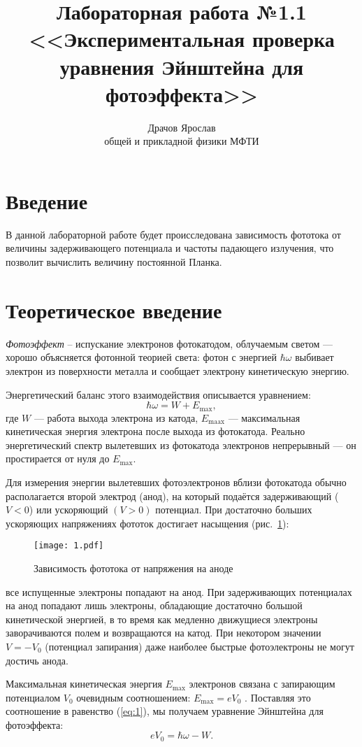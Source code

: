 \documentclass[a4paper]{article}
\title{Лабораторная работа №1.1\\  <<Экспериментальная проверка уравнения Эйнштейна для фотоэффекта>>}
\author{Драчов Ярослав \\ \Факультет общей и прикладной физики МФТИ}
\begin{document}
\maketitle
\section{Введение}
В данной лабораторной работе будет происследована зависимость
фототока от величины задерживающего потенциала и частоты
падающего излучения, что позволит вычислить величину постоянной
Планка.
\section{Теоретическое введение}
\emph{Фотоэффект} -- испускание электронов фотокатодом, облучаемым
светом  --- хорошо объясняется фотонной теорией света: фотон
с энергией $\hbar \omega$ выбивает электрон из поверхности
металла и сообщает электрону кинетическую энергию.

Энергетический баланс этого взаимодействия описывается уравнением:
\begin{equation}
	\hbar \omega = W + E_{\text{max}},
	\label{eq:1}
\end{equation}
где $W$ --- работа выхода электрона из катода, $E_{\text{maax}}$ ---
максимальная кинетическая энергия электрона после выхода из
фотокатода. Реально энергетический спектр вылетевших из фотокатода
электронов непрерывный --- он простирается от нуля до
$E_{\text{max}}$.

Для измерения энергии вылетевших фотоэлектронов вблизи фотокатода
обычно располагается второй электрод (анод), на который подаётся
задерживающий ($V<0$) или ускоряющий $(V>0)$ потенциал. При
достаточно больших ускоряющих напряжениях фототок достигает
насыщения (рис.~\ref{fig:1}):
\begin{figure}[h]
	\centering
	\texttt{[image: 1.pdf]}
	\caption{Зависимость фототока от напряжения на аноде}
	\label{fig:1}
\end{figure}
все испущенные электроны попадают на анод. При задерживающих
потенциалах на анод попадают лишь электроны, обладающие достаточно
большой кинетической энергией, в то время как медленно
движущиеся электроны заворачиваются полем и возвращаются на
катод. При некотором значении $V=-V_0$ (потенциал запирания)
даже наиболее быстрые фотоэлектроны не могут достичь анода.

Максимальная кинетическая энергия $E_{\text{max}}$ электронов
связана с запирающим потенциалом $V_0$ очевидным соотношением:
$E_{\text{max}}=e V_0 $ . Поставляя это соотношение в равенство (\ref{eq:1}), мы получаем уравнение Эйнштейна для фотоэффекта:
\begin{equation}
	e V_0= \hbar \omega -W
	\label{eq:2}
.\end{equation}
\end{document}
